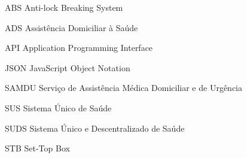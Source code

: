 \begin{siglas}
  \item[ABS] Anti-lock Breaking System
  \item[ADS] Assistência Domiciliar à Saúde 
  \item[API] Application Programming Interface
  \item[JSON] JavaScript Object Notation
  \item[SAMDU] Serviço de Assistência Médica Domiciliar e de Urgência 
  \item[SUS] Sistema Único de Saúde 
  \item[SUDS] Sistema Único e Descentralizado de Saúde 
  \item[STB] Set-Top Box
\end{siglas}